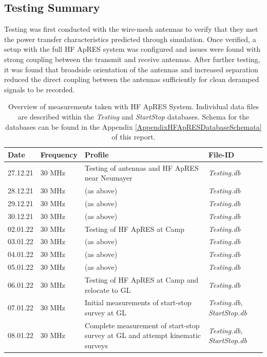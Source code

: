 \documentclass[a4paper,12pt]{article}
\begin{document}
\subsection{Testing Summary}
Testing was first conducted with the wire-mesh antennas to verify that they 
met the power transfer characteristics predicted through simulation.  Once
verified, a setup with the full HF ApRES system was configured and issues
were found with strong coupling between the transmit and receive antennas.
After further testing, it was found that broadside orientation of the antennas
and increased separation reduced the direct coupling between the antennas 
sufficiently for clean deramped signals to be recorded.


\begin{table}
  \begin{tabular}{m{1.5cm} m{2.25cm} m{7cm} >{\raggedright\arraybackslash}m{3cm}}
    \rowcolor{gray!50}
    Date & Frequency & Profile & File-ID\\
    \hline
    27.12.21 & 30 MHz & Testing of antennas and HF ApRES near Neumayer & \textit{Testing.db} \\
    28.12.21 & 30 MHz & (as above) & \textit{Testing.db} \\
    29.12.21 & 30 MHz & (as above) & \textit{Testing.db} \\
    30.12.21 & 30 MHz & (as above) & \textit{Testing.db} \\
    02.01.22 & 30 MHz & Testing of HF ApRES at Camp & \textit{Testing.db} \\
    03.01.22 & 30 MHz & (as above) & \textit{Testing.db} \\
    04.01.22 & 30 MHz & (as above) & \textit{Testing.db} \\
    05.01.22 & 30 MHz & (as above) & \textit{Testing.db} \\
    06.01.22 & 30 MHz & Testing of HF ApRES at Camp and relocate to GL & \textit{Testing.db} \\
    07.01.22 & 30 MHz & Initial measurements of start-stop survey at GL & \textit{Testing.db, StartStop.db} \\
    08.01.22 & 30 MHz & Complete measurement of start-stop survey at GL and attempt kinematic surveys & \textit{Testing.db, StartStop.db} \\
    \hline
  \end{tabular}
  \label{TableHFApRES}
  \caption{Overview of measurements taken with HF ApRES System.  Individual data
  files are described within the \textit{Testing} and \textit{StartStop}
  databases.  Schema for the databases can be found in the Appendix
  \ref{AppendixHFApRESDatabaseSchemata} of this report.} 
\end{table}
\end{document}
